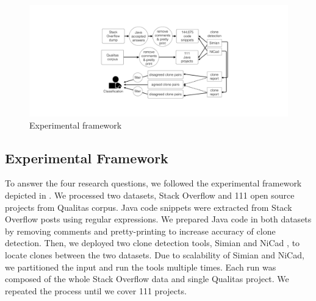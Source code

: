 \documentclass{sig-alternate-05-2015}
\begin{document}
\begin{figure}
	\centering
	\includegraphics[width=\linewidth]{exp_framework_new}
	\caption{Experimental framework}
	\label{fig:exp_framework}
\end{figure}

\subsection{Experimental Framework}
To answer the four research questions, we followed the experimental framework depicted in . We processed two datasets, Stack Overflow and 111 open source projects from Qualitas corpus. Java code snippets were extracted from Stack Overflow posts using regular expressions. We prepared Java code in both datasets by removing comments and pretty-printing to increase accuracy of clone detection. Then, we deployed two clone detection tools, Simian \cite{simian} and NiCad \cite{Roy2008,Cordy}, to locate clones between the two datasets. Due to scalability of Simian and NiCad, we partitioned the input and run the tools multiple times. Each run was composed of the whole Stack Overflow data and single Qualitas project. We repeated the process until we cover 111 projects. 
\end{document}
